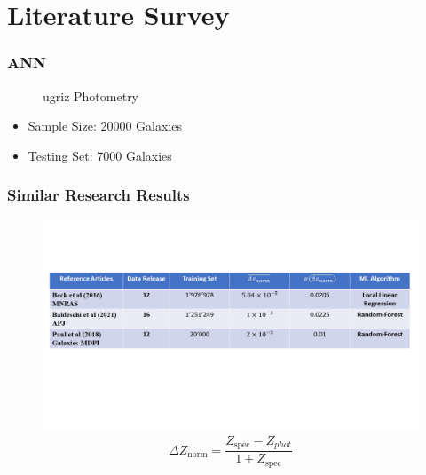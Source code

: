 \documentclass{beamer}
\begin{document}
\section{Literature Survey}
\begin{frame}
        \frametitle{ANN}
        \begin{figure}
            \caption*{ugriz Photometry}
        \end{figure}
        \begin{itemize}
            \item Sample Size: 20000 Galaxies
            \item Testing Set: 7000 Galaxies
        \end{itemize}
        \end{frame}

\begin{frame}
        \frametitle{Similar Research Results}
        \begin{figure}
\vspace*{-18mm}
            \includegraphics[scale=0.37]{img/Litsurvey.png}
\vspace*{-25mm}
\begin{equation}
\Delta Z_{\text {norm}}=\frac{Z_{\text {spec}}-Z_{phot}}{1+Z_{\text {spec}}}
\end{equation}
        \end{figure}
     
        \end{frame}
\end{document}
